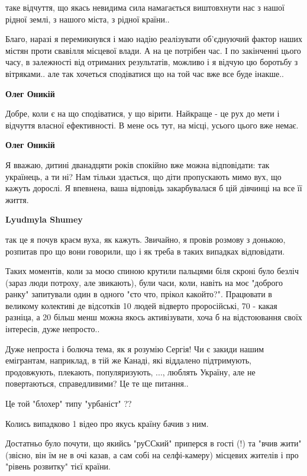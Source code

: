 \begin{itemize}
\begin{itemize}
таке відчуття, що якась невидима сила намагається виштовхнути нас з нашої
рідної землі, з нашого міста, з рідної країни..

Благо, наразі я перемикнувся і маю надію реалізувати об'єднуючий фактор наших
містян проти свавілля місцевої влади. А на це потрібен час. І по закінченні
цього часу, в залежності від отриманих результатів, можливо і я відчую цю
боротьбу з вітряками.. але так хочеться сподіватися що на той час вже все буде
інакше..

\textbf{Олег Оникій} 

Добре, коли є на що сподіватися, у що вірити. Найкраще - це рух до мети і
відчуття власної ефективності. В мене ось тут, на місці, усього цього вже
немає.

\textbf{Олег Оникій} 

Я вважаю, дитині дванадцяти років спокійно вже можна відповідати: так
українець, а ти ні? Нам тільки здається, що діти пропускають мимо вух, що
кажуть дорослі. Я впевнена, ваша відповідь закарбувалася б цій дівчинці на все
її життя.

\textbf{Lyudmyla Shumey} 

так це я почув краєм вуха, як кажуть. Звичайно, я провів розмову з донькою,
розпитав про що вони говорили, що і як треба в таких випадках відповідати.

Таких моментів, коли за моєю спиною крутили пальцями біля скроні було безліч
(зараз люди потроху, але звикають), були часи, коли, навіть на моє "доброго
ранку" запитували один в одного "єто что, прікол какойто?". Працювати в
великому колективі де відсотків 10 людей відверто проросійські, 70 - какая
разніца, а 20 більш менш можна якось активізувати, хоча б на відстоювання своїх
інтересів, дуже непросто..

Дуже непроста і болюча тема, як я розумію Сергія! Чи є закиди нашим емігрантам,
наприклад, в тій же Канаді, які віддалено підтримують, продовжують, плекають,
популяризують, ..., люблять Україну, але не повертаються, справедливими? Це те
ще питання..

\end{itemize} %


Це той "блохер" типу "урбаніст" ??

Колись випадково 1 відео про якусь країну бачив з ним.

Достатньо було почути, що якийсь "руССкий" приперся в гості (!) та "вчив жити"
(звісно, він їм не в очі казав, а сам собі на селфі-камеру) місцевих жителів і
про "рівень розвитку" тієї країни.


\end{itemize}
